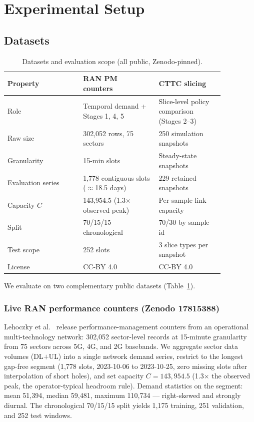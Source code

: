 \section{Experimental Setup}
\label{sec:setup}

\subsection{Datasets}

\begin{table}[!t]
\caption{Datasets and evaluation scope (all public, Zenodo-pinned).}
\label{tab:datasets}
\centering
\small
\begin{tabular}{@{}p{0.30\linewidth}p{0.30\linewidth}p{0.26\linewidth}@{}}
\toprule
Property & RAN PM counters~\cite{lehoczky2026ran} & CTTC slicing~\cite{farreras2024cttc} \\
\midrule
Role & Temporal demand + Stages 1, 4, 5 & Slice-level policy comparison (Stages 2--3) \\
Raw size & 302{,}052 rows, 75 sectors & 250 simulation snapshots \\
Granularity & 15-min slots & Steady-state snapshots \\
Evaluation series & 1{,}778 contiguous slots ($\approx$18.5 days) & 229 retained snapshots \\
Capacity $C$ & 143{,}954.5 (1.3$\times$ observed peak) & Per-sample link capacity \\
Split & 70/15/15 chronological & 70/30 by sample id \\
Test scope & 252 slots & 3 slice types per snapshot \\
License & CC-BY 4.0 & CC-BY 4.0 \\
\bottomrule
\end{tabular}
\end{table}

We evaluate on two complementary public datasets
(Table~\ref{tab:datasets}).

\subsubsection{Live RAN performance counters (Zenodo 17815388)}
Lehoczky et al.~\cite{lehoczky2026ran} release performance-management
counters from an operational multi-technology network: 302{,}052
sector-level records at 15-minute granularity from 75 sectors across
5G, 4G, and 2G basebands. We aggregate sector data volumes
(DL$+$UL) into a single network demand series, restrict to the
longest gap-free segment (1{,}778 slots, 2023-10-06 to 2023-10-25,
zero missing slots after interpolation of short holes), and set
capacity $C = 143{,}954.5$ (1.3$\times$ the observed peak, the
operator-typical headroom rule). Demand statistics on the segment:
mean 51{,}394, median 59{,}481, maximum 110{,}734 --- right-skewed
and strongly diurnal. The chronological 70/15/15 split yields
1{,}175 training, 251 validation, and 252 test windows.

